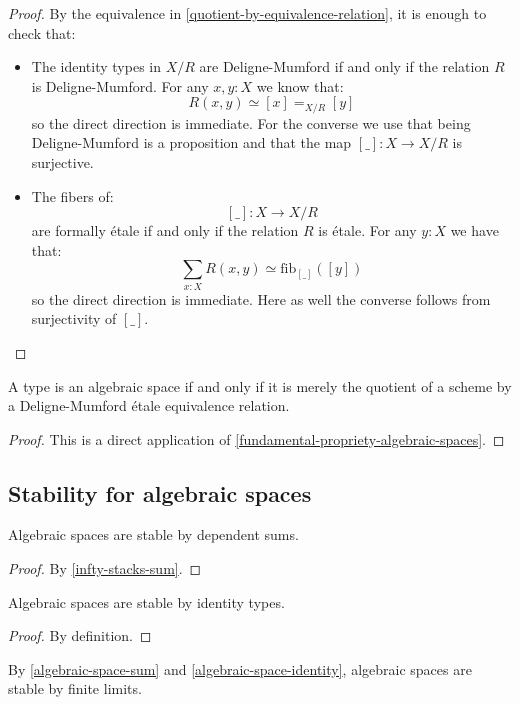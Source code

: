\begin{proof}
By the equivalence in \cref{quotient-by-equivalence-relation}, it is enough to check that:
\begin{itemize}
\item The identity types in $X/R$ are Deligne-Mumford if and only if the relation $R$ is Deligne-Mumford. For any $x,y:X$ we know that:
\[R(x,y) \simeq [x] =_{X/R}[y]\]
so the direct direction is immediate. For the converse we use that being Deligne-Mumford is a proposition and that the map $[\_]:X\to X/R$ is surjective.
\item The fibers of: 
\[[\_]:X\to X/R\] 
are formally étale if and only if the relation $R$ is étale. For any $y:X$ we have that:
\[\sum_{x:X} R(x,y) \simeq \mathrm{fib}_{[\_]}([y])\]
so the direct direction is immediate. Here as well the converse follows from surjectivity of $[\_]$.
\end{itemize}
\end{proof}

\begin{theorem}
A type is an algebraic space if and only if it is merely the quotient of a scheme by a Deligne-Mumford étale equivalence relation.
\end{theorem}

\begin{proof}
This is a direct application of \cref{fundamental-propriety-algebraic-spaces}.
\end{proof}

\subsection{Stability for algebraic spaces}

\begin{lemma}\label{algebraic-space-sum}
Algebraic spaces are stable by dependent sums.
\end{lemma}

\begin{proof}
By \cref{infty-stacks-sum}.
\end{proof}

\begin{lemma}\label{algebraic-space-identity}
Algebraic spaces are stable by identity types.
\end{lemma}

\begin{proof}
By definition.
\end{proof}

By \cref{algebraic-space-sum} and \cref{algebraic-space-identity}, algebraic spaces are stable by finite limits.

